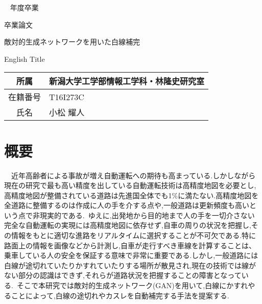 \documentclass[a4j, 11pt]{jarticle}
\newcounter{fiscal_year}         %
\begin{document}
\begin{titlepage}\Large ~
{\normalsize \the\value{fiscal_year} 年度卒業}
\vfill
\begin{center}

{\Huge 卒業論文}
\end{center}
\begin{center}

敵対的生成ネットワークを用いた白線補完
\end{center}
\begin{center}

English Title
\end{center}
\vfill
\begin{center}
\begin{tabular}{|c|l|}
\hline

所属 & 新潟大学工学部情報工学科・林隆史研究室 \\
\hline

在籍番号 & T16I273C \\
\hline

氏名 & 小松 耀人 \\
\hline
\end{tabular}
\end{center}
\vspace{1cm}
\vfill
\end{titlepage}
\pagebreak
\addtocounter{page}{1}
\thispagestyle{empty}  %

\section*{概要}
　近年高齢者による事故が増え自動運転への期待も高まっている.しかしながら現在の研究で最も高い精度を出している自動運転技術は高精度地図を必要とし,高精度地図が整備されている道路は先進国全体でも1\%に満たない.高精度地図を全道路に整備するのは作成に人の手を介する点や,一般道路は更新頻度も高いという点で非現実的である. ゆえに,出発地から目的地まで人の手を一切介さない完全な自動運転の実現には高精度地図に依存せず,自車の周りの状況を把握し,その情報をもとに適切な進路をリアルタイムに選択することが不可欠である.特に路面上の情報を画像などから計測し,自車が走行すべき車線を計算することは、乗車している人の安全を保証する意味で非常に重要である.しかし,一般道路には白線が途切れていたりかすれていたりする場所が散見され,現在の技術では線がない部分の認識はできず,それらが道路状況を把握することの障害となっている. そこで本研究では敵対的生成ネットワーク(GAN)を用いて,白線にかすれやることによって,白線の途切れやカスレを自動補完する手法を提案する.
\end{document}
